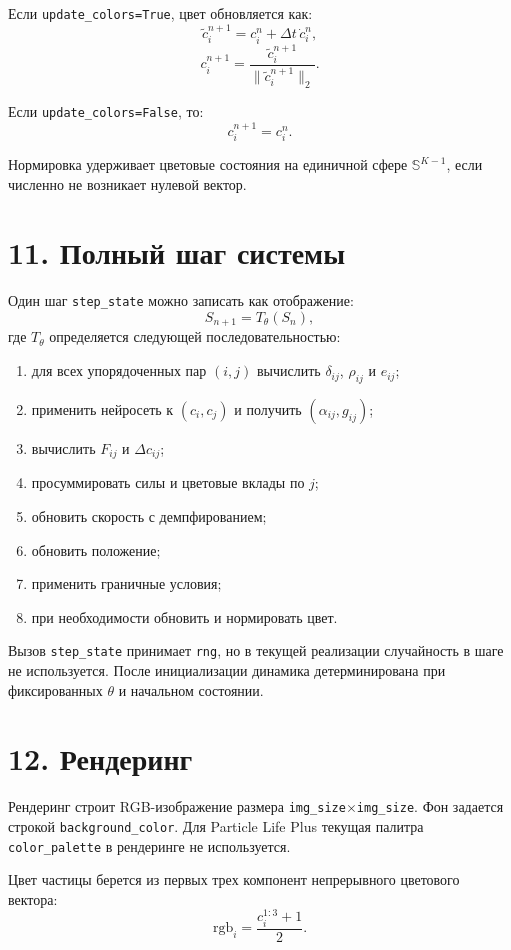 \documentclass[11pt,a4paper]{article}
\begin{document}
Если \texttt{update\_colors=True}, цвет обновляется как:
\[
\tilde{c}_i^{n+1}=c_i^n+\Delta t\,\dot{c}_i^n,
\]
\[
c_i^{n+1}=
\frac{\tilde{c}_i^{n+1}}{\|\tilde{c}_i^{n+1}\|_2}.
\]

Если \texttt{update\_colors=False}, то:
\[
c_i^{n+1}=c_i^n.
\]

Нормировка удерживает цветовые состояния на единичной сфере
$\mathbb{S}^{K-1}$, если численно не возникает нулевой вектор.

\section*{11. Полный шаг системы}

Один шаг \texttt{step\_state} можно записать как отображение:
\[
S_{n+1}=T_\theta(S_n),
\]
где $T_\theta$ определяется следующей последовательностью:
\begin{enumerate}
  \item для всех упорядоченных пар $(i,j)$ вычислить $\delta_{ij}$, $\rho_{ij}$ и $e_{ij}$;
  \item применить нейросеть к $(c_i,c_j)$ и получить $(\alpha_{ij},g_{ij})$;
  \item вычислить $F_{ij}$ и $\Delta c_{ij}$;
  \item просуммировать силы и цветовые вклады по $j$;
  \item обновить скорость с демпфированием;
  \item обновить положение;
  \item применить граничные условия;
  \item при необходимости обновить и нормировать цвет.
\end{enumerate}

Вызов \texttt{step\_state} принимает \texttt{rng}, но в текущей реализации
случайность в шаге не используется. После инициализации динамика детерминирована
при фиксированных $\theta$ и начальном состоянии.

\section*{12. Рендеринг}

Рендеринг строит RGB-изображение размера \texttt{img\_size}$\times$\texttt{img\_size}.
Фон задается строкой \texttt{background\_color}. Для Particle Life Plus текущая
палитра \texttt{color\_palette} в рендеринге не используется.

Цвет частицы берется из первых трех компонент непрерывного цветового вектора:
\[
\mathrm{rgb}_i=\frac{c_i^{1:3}+1}{2}.
\]
\end{document}

